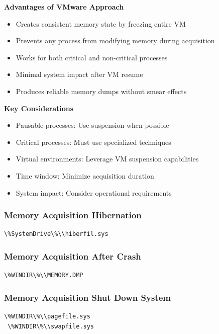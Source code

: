 \textbf{Advantages of VMware Approach}
\begin{itemize}
   \item Creates consistent memory state by freezing entire VM
   \item Prevents any process from modifying memory during acquisition
   \item Works for both critical and non-critical processes
   \item Minimal system impact after VM resume
   \item Produces reliable memory dumps without smear effects
\end{itemize}

\textbf{Key Considerations}
\begin{itemize}
   \item Pausable processes: Use suspension when possible
   \item Critical processes: Must use specialized techniques
   \item Virtual environments: Leverage VM suspension capabilities
   \item Time window: Minimize acquisition duration
   \item System impact: Consider operational requirements
\end{itemize}


\subsubsection*{Memory Acquisition Hibernation}
\begin{lstlisting}[language=sh]
 \%SystemDrive\%\\hiberfil.sys 
\end{lstlisting}

\subsubsection*{Memory Acquisition After Crash}
\begin{lstlisting}[language=sh]
 \%WINDIR\%\\MEMORY.DMP
\end{lstlisting}

\subsubsection*{Memory Acquisition Shut Down System}
\begin{lstlisting}[language=sh]
 \%WINDIR\%\\pagefile.sys
 \%WINDIR\%\\swapfile.sys
\end{lstlisting}


